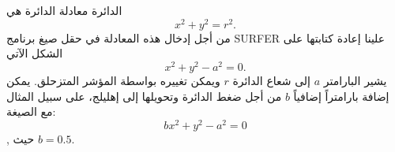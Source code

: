 \begin{surferPage}[دائرة]{الدائرة}
معادلة الدائرة هي
\[x^2+y^2=r^2.\]
من أجل إدخال هذه المعادلة في حقل صيغ برنامج \textenglish{SURFER} علينا إعادة كتابتها على الشكل الآتي
\[x^2+y^2-a^2=0.\]
يشير البارامتر $a$ إلى شعاع الدائرة $r$ ويمكن تغييره بواسطة المؤشر المتزحلق. يمكن إضافة بارامتراً إضافياً $ b $ من أجل ضغط الدائرة وتحويلها إلى إهليلج، على سبيل المثال مع الصيغة:
\[bx^2+y^2-a^2=0\], حيث $b=0.5$.
\end{surferPage}
